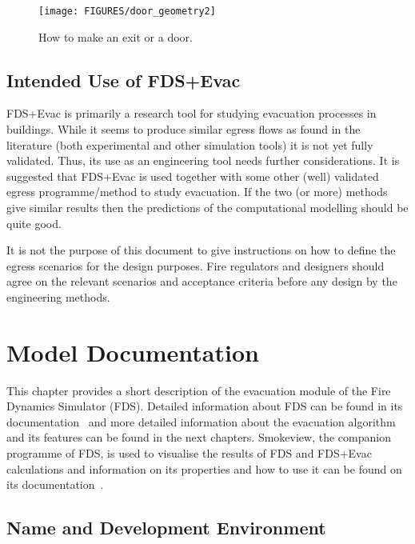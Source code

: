 \documentclass[12pt,a4paper,final,twoside]{stylevk}
\begin{document}
%
\begin{figure}[!tb]
  \centerline{\texttt{[image: FIGURES/door\_geometry2]}}
  \caption{How to make an exit or a door.}\label{Fig_DoorGeom} 
\end{figure}
%


\section{Intended Use of FDS+Evac}\label{Sec_IntUsers}

\noindent FDS+Evac is primarily a research tool for studying
evacuation processes in buildings.  While it seems to produce similar
egress flows as found in the literature (both experimental and other
simulation tools) it is not yet fully validated.  Thus, its use as an
engineering tool needs further considerations.  It is suggested that
FDS+Evac is used together with some other (well) validated egress
programme/method to study evacuation.  If the two (or more) methods
give similar results then the predictions of the computational
modelling should be quite good.


It is not the purpose of this document to give instructions on how to
define the egress scenarios for the design purposes.  Fire regulators
and designers should agree on the relevant scenarios and acceptance
criteria before any design by the engineering methods.

\clearpage

\newpage


\chapter{Model Documentation}\label{Sec_ModelDef}

\noindent This chapter provides a short description of the evacuation
module of the Fire Dynamics Simulator (FDS).  Detailed information
about FDS can be found in its documentation~\cite{FDS_Manual,
  FDS_UserGuide, FDS_VVGuide1, FDS_VVGuide2} and more detailed
information about the evacuation algorithm and its features can be
found in the next chapters.  Smokeview, the companion programme of
FDS, is used to visualise the results of FDS and FDS+Evac calculations
and information on its properties and how to use it can be found on
its documentation~\cite{SV_UserGuide, SV_TechGuide, SV_VVGuide}.


\section{Name and Development Environment}
\end{document}

